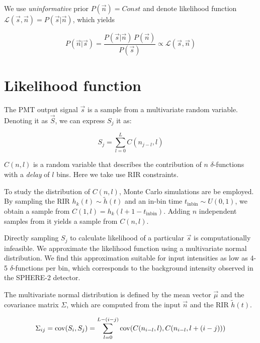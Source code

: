 We use \textit{uninformative} prior $P(\vec{n}) = Const$ and denote likelihood function $\mathcal{L}(\vec{s}, \vec{n}) = P(\vec{s} | \vec{n})$, which yields

\begin{equation}
	\label{eq:bayes-theorem-adapted}
	P(\vec{n} | \vec{s}) = \frac{P(\vec{s} | \vec{n}) \, P(\vec{n})}{P(\vec{s})} \propto \mathcal{L}(\vec{s}, \vec{n})
\end{equation}

\section{Likelihood function}
\label{sec:naive-monte-carlo-likelihood}

The PMT output signal $\vec{s}$ is a sample from a multivariate random variable. Denoting it as $\vec{S}$, we can express $S_j$ it as:

\begin{equation}
	S_j = \sum_{l=0}^{L} C(n_{j-l}, l)
	\label{eq:S-definition-as-random-variable}
\end{equation}

$C(n, l)$ is a random variable that describes the contribution of $n$ $\delta$-functions with a \textit{delay} of $l$ bins. Here we take use RIR constraints.

To study the distribution of $C(n, l)$, Monte Carlo simulations are be employed. By sampling the RIR $h_k(t) \sim \tilde{h}(t)$ and an in-bin time $t_{\text{inbin}} \sim U(0, 1)$, we obtain a sample from $C(1, l) = h_k(l + 1 - t_{\text{inbin}})$. Adding $n$ independent samples from it yields a sample from $C(n, l)$.

Directly sampling $S_j$ to calculate likelihood of a particular $\vec{s}$ is computationally infeasible. We approximate the likelihood function using a multivariate normal distribution. We find this approximation suitable for input intensities as low as 4-5 $\delta$-functions per bin, which corresponds to the background intensity observed in the SPHERE-2 detector.

The multivariate normal distribution is defined by the mean vector $\vec{\mu}$ and the covariance matrix $\Sigma$, which are computed from the input $\vec{n}$ and the RIR $\tilde{h}(t)$.

\begin{equation}
	\Sigma_{ij} = \mathrm{cov}(S_i, S_j) = \sum_{l=0}^{L - (i-j)} \mathrm{cov}(C(n_{i-l}, l), C(n_{i-l}, l + (i-j)))
\end{equation}

